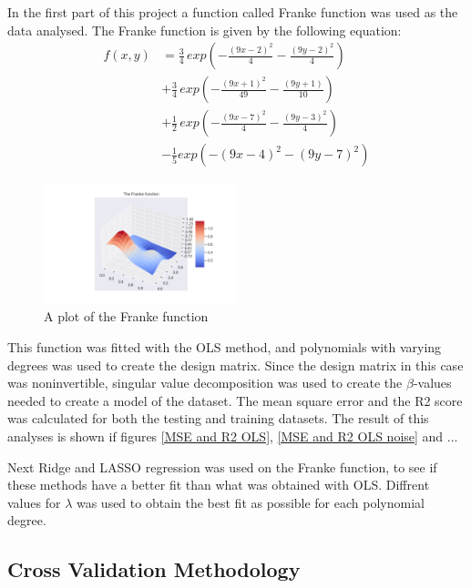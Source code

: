 \thispagestyle{plain}

\noindent In the first part of this project a function called Franke function
 was used as the data analysed. The Franke function is given by the following 
 equation:
\begin{align*}
    f(x,y) &= \frac{3}{4} \, exp\left(- \frac{(9x-2)^2}{4} - \frac{(9y-2)^2}{4}\right) \\
    &+ \frac{3}{4}\, exp\left( - \frac{(9x +1)^2}{49} - \frac{(9y+1)}{10}\right) \\
    &+ \frac{1}{2}\, exp\left( -\frac{(9x-7)^2}{4} - \frac{(9y-3)^2}{4}\right) \\
    &- \frac{1}{5} exp \left( - (9x -4)^2 - (9y-7)^2\right)
\end{align*}
\begin{figure}[H]
	\centering
	\includegraphics[width=0.5\textwidth]{Figure_1.png}
	\caption{\centering A plot of the Franke function }
	\label{Franke function}
\end{figure}
\noindent This function was fitted with the OLS method, 
and polynomials with varying degrees was used to create the design matrix.
Since the design matrix in this case was noninvertible, singular value 
decomposition was used to create the $\beta$-values needed to create a model
of the dataset. The mean square error and the R2 score was calculated 
for both the testing and training datasets. The result of this analyses is 
shown if figures \eqref{MSE and R2 OLS}, \eqref{MSE and R2 OLS noise} and ...

\noindent Next Ridge and LASSO regression was used on the Franke function,
to see if these methods have a better fit than what was obtained with OLS.
Diffrent values for $\lambda$ was used to obtain the best fit as possible for each
polynomial degree.

\subsection{Cross Validation Methodology}

